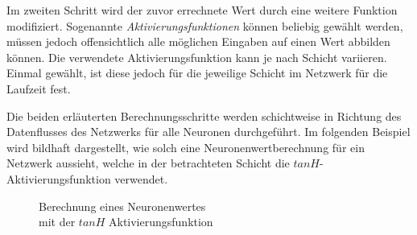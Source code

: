 Im zweiten Schritt wird der zuvor errechnete Wert durch eine weitere Funktion
modifiziert. Sogenannte \emph{Aktivierungsfunktionen} können beliebig gewählt
werden, müssen jedoch offensichtlich alle möglichen Eingaben auf einen Wert
abbilden können. Die verwendete Aktivierungsfunktion kann je nach
Schicht variieren. Einmal gewählt, ist diese jedoch für die jeweilige Schicht
im Netzwerk für die Laufzeit fest.

Die beiden erläuterten Berechnungsschritte werden schichtweise in Richtung des
Datenflusses des Netzwerks für alle Neuronen durchgeführt. Im folgenden
Beispiel wird bildhaft dargestellt, wie solch eine Neuronenwertberechnung für
ein Netzwerk aussieht, welche in der betrachteten Schicht die
$tanH$-Aktivierungsfunktion verwendet.

\begin{figure}
    \centering
    \caption{Berechnung eines Neuronenwertes\\mit der $tanH$ Aktivierungsfunktion}
\end{figure}

